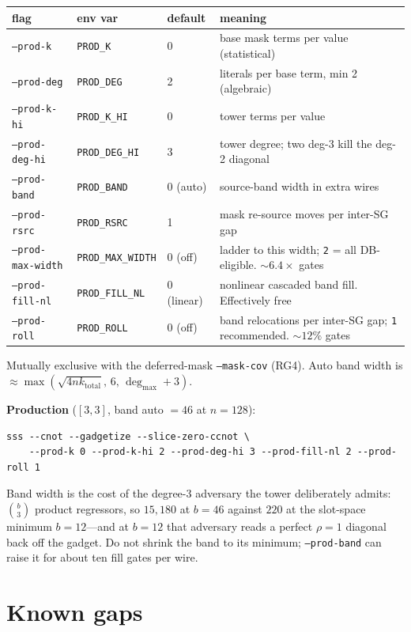 \documentclass[11pt]{article}
\begin{document}
\begin{center}
\begin{tabular}{llll}
\toprule
flag & env var & default & meaning \\
\midrule
\texttt{--prod-k} & \texttt{PROD\_K} & 0 & base mask terms per value (statistical) \\
\texttt{--prod-deg} & \texttt{PROD\_DEG} & 2 & literals per base term, min 2 (algebraic) \\
\texttt{--prod-k-hi} & \texttt{PROD\_K\_HI} & 0 & tower terms per value \\
\texttt{--prod-deg-hi} & \texttt{PROD\_DEG\_HI} & 3 & tower degree; two deg-3 kill the deg-2 diagonal \\
\texttt{--prod-band} & \texttt{PROD\_BAND} & 0 (auto) & source-band width in extra wires \\
\texttt{--prod-rsrc} & \texttt{PROD\_RSRC} & 1 & mask re-source moves per inter-SG gap \\
\texttt{--prod-max-width} & \texttt{PROD\_MAX\_WIDTH} & 0 (off) & ladder to this width; \texttt{2} = all DB-eligible. ${\sim}6.4\times$ gates \\
\texttt{--prod-fill-nl} & \texttt{PROD\_FILL\_NL} & 0 (linear) & nonlinear cascaded band fill. Effectively free \\
\texttt{--prod-roll} & \texttt{PROD\_ROLL} & 0 (off) & band relocations per inter-SG gap; \texttt{1} recommended. ${\sim}12\%$ gates \\
\bottomrule
\end{tabular}
\end{center}

Mutually exclusive with the deferred-mask \texttt{--mask-cov} (RG4).
Auto band width is ${\approx}\max(\sqrt{4nk_{\mathrm{total}}},\,6,\,\deg_{\max}+3)$.

\textbf{Production} ($[3,3]$, band auto $= 46$ at $n{=}128$):
\begin{verbatim}
sss --cnot --gadgetize --slice-zero-ccnot \
    --prod-k 0 --prod-k-hi 2 --prod-deg-hi 3 --prod-fill-nl 2 --prod-roll 1
\end{verbatim}
Band width is the cost of the degree-3 adversary the tower deliberately admits:
$\binom{b}{3}$ product regressors, so $15{,}180$ at $b{=}46$ against $220$ at the
slot-space minimum $b{=}12$---and at $b{=}12$ that adversary reads a perfect
$\rho{=}1$ diagonal back off the gadget. Do not shrink the band to its minimum;
\texttt{--prod-band} can raise it for about ten fill gates per wire.

\section{Known gaps}
\end{document}
